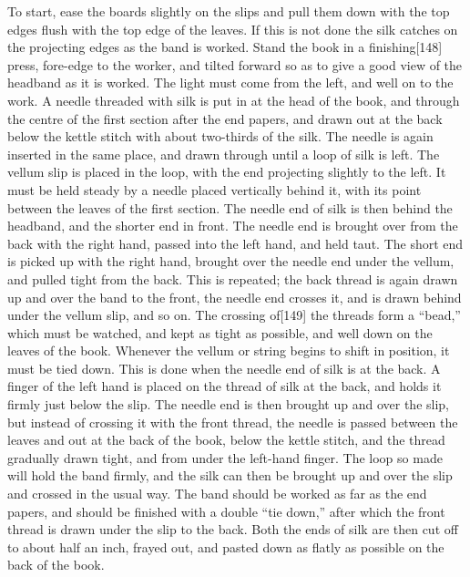 \documentclass[
]{article}
\begin{document}
To start, ease the boards slightly on the slips and pull them down with
the top edges flush with the top edge of the leaves. If this is not done
the silk catches on the projecting edges as the band is worked. Stand
the book in a finishing{\protect\hypertarget{Page_148}{}{{[}148{]}}}
press, fore-edge to the worker, and tilted forward so as to give a good
view of the headband as it is worked. The light must come from the left,
and well on to the work. A needle threaded with silk is put in at the
head of the book, and through the centre of the first section after the
end papers, and drawn out at the back below the kettle stitch with about
two-thirds of the silk. The needle is again inserted in the same place,
and drawn through until a loop of silk is left. The vellum slip is
placed in the loop, with the end projecting slightly to the left. It
must be held steady by a needle placed vertically behind it, with its
point between the leaves of the first section. The needle end of silk is
then behind the headband, and the shorter end in front. The needle end
is brought over from the back with the right hand, passed into the left
hand, and held taut. The short end is picked up with the right hand,
brought over the needle end under the vellum, and pulled tight from the
back. This is repeated; the back thread is again drawn up and over the
band to the front, the needle end crosses it, and is drawn behind under
the vellum slip, and so on. The crossing
of{\protect\hypertarget{Page_149}{}{{[}149{]}}} the threads form a
``bead,'' which must be watched, and kept as tight as possible, and well
down on the leaves of the book. Whenever the vellum or string begins to
shift in position, it must be tied down. This is done when the needle
end of silk is at the back. A finger of the left hand is placed on the
thread of silk at the back, and holds it firmly just below the slip. The
needle end is then brought up and over the slip, but instead of crossing
it with the front thread, the needle is passed between the leaves and
out at the back of the book, below the kettle stitch, and the thread
gradually drawn tight, and from under the left-hand finger. The loop so
made will hold the band firmly, and the silk can then be brought up and
over the slip and crossed in the usual way. The band should be worked as
far as the end papers, and should be finished with a double ``tie
down,'' after which the front thread is drawn under the slip to the
back. Both the ends of silk are then cut off to about half an inch,
frayed out, and pasted down as flatly as possible on the back of the
book.
\end{document}
